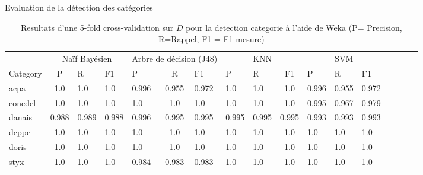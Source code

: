 \documentclass[newPxFont,pagenumber]{beamer}
\begin{document}
\begin{frame}{Evaluation de la détection des catégories}
\begin{table}
\tiny
\caption{Resultats d'une 5-fold cross-validation sur $D$ pour la detection categorie  à l'aide de Weka \cite{frank2016weka}  (P= Precision, R=Rappel, F1 = F1-mesure)}\label{best_classif_score}
\begin{tabular}{l|c@{\hskip 0.1in}lllc@{\hskip 0.1in}lllc@{\hskip 0.1in}lllc@{\hskip 0.1in}lll}
\hline\noalign{\smallskip}
       &   \multicolumn{3}{c}{Naïf Bayésien}    &    \multicolumn{3}{c}{Arbre de décision (J48)}   &  \multicolumn{3}{c}{KNN}  & \multicolumn{3}{c}{SVM}     \\       
\noalign{\smallskip}
\hline
\noalign{\smallskip}
  Category      & P     & R     & F1    & P     & R     & F1    & P     & R     & F1    & P     & R     & F1    \\        
\noalign{\smallskip}
\hline
\noalign{\smallskip}
acpa    & 1.0 & 1.0 & 1.0 & 0.996 & 0.955 & 0.972 & 1.0 & 1.0 & 1.0 & 0.996 & 0.955 & 0.972 \\
concdel & 1.0 & 1.0 & 1.0 & 1.0 & 1.0 & 1.0 & 1.0 & 1.0 & 1.0 & 0.995 & 0.967 & 0.979 \\
danais  & 0.988 & 0.989 & 0.988 & 0.996 & 0.995 & 0.995 & 0.995 & 0.995 & 0.995 & 0.993 & 0.993 & 0.993 \\
dcppc   & 1.0 & 1.0 & 1.0 & 1.0 & 1.0 & 1.0 & 1.0 & 1.0 & 1.0 & 1.0 & 1.0 & 1.0 \\
doris   & 1.0 & 1.0 & 1.0 & 1.0 & 1.0 & 1.0 & 1.0 & 1.0 & 1.0 & 1.0 & 1.0 & 1.0 \\
styx    & 1.0 & 1.0 & 1.0 & 0.984 & 0.983 & 0.983 & 1.0 & 1.0 & 1.0 & 1.0 & 1.0 & 1.0 \\
\hline
\end{tabular}
\end{table}
\end{frame}
\end{document}
